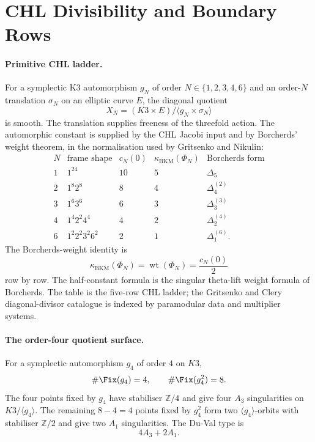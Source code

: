 \providecommand{\kBKM}{\kappa_{\mathrm{BKM}}}
\providecommand{\kch}{\kappa_{\mathrm{ch}}}
\providecommand{\kcat}{\kappa_{\mathrm{cat}}}
\providecommand{\kfib}{\kappa_{\mathrm{fiber}}}
\providecommand{\ZZ}{\mathbb{Z}}

\section*{CHL Divisibility and Boundary Rows}

\paragraph{Primitive CHL ladder.}
For a symplectic K3 automorphism $g_N$ of order
$N\in\{1,2,3,4,6\}$ and an order-$N$ translation $\sigma_N$ on an
elliptic curve $E$, the diagonal quotient
\[
X_N=(K3\times E)/\langle g_N\times\sigma_N\rangle
\]
is smooth. The translation supplies freeness of the threefold action.
The automorphic constant is supplied by the CHL Jacobi input and by
Borcherds' weight theorem, in the normalisation used by Gritsenko and
Nikulin:
\[
\begin{array}{c|c|c|c|c}
N & \text{frame shape} & c_N(0) & \kBKM(\Phi_N) & \text{Borcherds form}\\
\hline
1 & 1^{24} & 10 & 5 & \Delta_5\\
2 & 1^8 2^8 & 8 & 4 & \Delta_4^{(2)}\\
3 & 1^6 3^6 & 6 & 3 & \Delta_3^{(3)}\\
4 & 1^4 2^2 4^4 & 4 & 2 & \Delta_2^{(4)}\\
6 & 1^2 2^2 3^2 6^2 & 2 & 1 & \Delta_1^{(6)} .
\end{array}
\]
The Borcherds-weight identity is
\[
\kBKM(\Phi_N)=\operatorname{wt}(\Phi_N)=\frac{c_N(0)}2
\]
row by row. The half-constant formula is the singular theta-lift
weight formula of Borcherds. The table is the five-row CHL ladder;
the Gritsenko and Clery diagonal-divisor catalogue is indexed by
paramodular data and multiplier systems.

\paragraph{The order-four quotient surface.}
For a symplectic automorphism $g_4$ of order $4$ on $K3$,
\[
\#\Fix(g_4)=4,\qquad \#\Fix(g_4^2)=8.
\]
The four points fixed by $g_4$ have stabiliser $\ZZ/4$ and give four
$A_3$ singularities on $K3/\langle g_4\rangle$. The remaining
$8-4=4$ points fixed by $g_4^2$ form two $\langle g_4\rangle$-orbits
with stabiliser $\ZZ/2$ and give two $A_1$ singularities. The Du-Val
type is
\[
4A_3+2A_1.
\]

